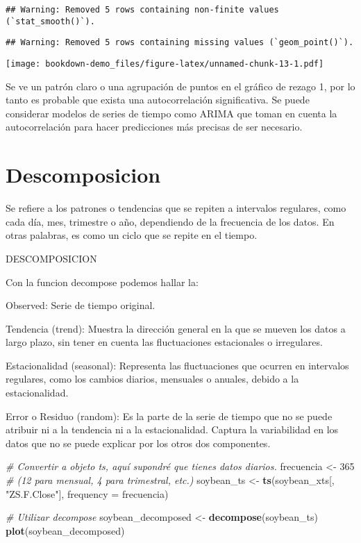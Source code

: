 \documentclass[
]{book}
\newenvironment{Shaded}{\begin{snugshade}}{\end{snugshade}}
\newcommand{\AttributeTok}[1]{\textcolor[rgb]{0.13,0.29,0.53}{#1}}
\newcommand{\CommentTok}[1]{\textcolor[rgb]{0.56,0.35,0.01}{\textit{#1}}}
\newcommand{\DecValTok}[1]{\textcolor[rgb]{0.00,0.00,0.81}{#1}}
\newcommand{\FunctionTok}[1]{\textcolor[rgb]{0.13,0.29,0.53}{\textbf{#1}}}
\newcommand{\NormalTok}[1]{#1}
\newcommand{\OtherTok}[1]{\textcolor[rgb]{0.56,0.35,0.01}{#1}}
\newcommand{\StringTok}[1]{\textcolor[rgb]{0.31,0.60,0.02}{#1}}
\begin{document}
\begin{verbatim}
## Warning: Removed 5 rows containing non-finite values (`stat_smooth()`).
\end{verbatim}

\begin{verbatim}
## Warning: Removed 5 rows containing missing values (`geom_point()`).
\end{verbatim}

\texttt{[image: bookdown-demo\_files/figure-latex/unnamed-chunk-13-1.pdf]}

Se ve un patrón claro o una agrupación de puntos en el gráfico de rezago 1, por lo tanto es probable que exista una autocorrelación significativa. Se puede considerar modelos de series de tiempo como ARIMA que toman en cuenta la autocorrelación para hacer predicciones más precisas de ser necesario.

\hypertarget{descomposicion}{%
\chapter{Descomposicion}\label{descomposicion}}

Se refiere a los patrones o tendencias que se repiten a intervalos regulares, como cada día, mes, trimestre o año, dependiendo de la frecuencia de los datos. En otras palabras, es como un ciclo que se repite en el tiempo.

DESCOMPOSICION

Con la funcion decompose podemos hallar la:

Observed: Serie de tiempo original.

Tendencia (trend): Muestra la dirección general en la que se mueven los datos a largo plazo, sin tener en cuenta las fluctuaciones estacionales o irregulares.

Estacionalidad (seasonal): Representa las fluctuaciones que ocurren en intervalos regulares, como los cambios diarios, mensuales o anuales, debido a la estacionalidad.

Error o Residuo (random): Es la parte de la serie de tiempo que no se puede atribuir ni a la tendencia ni a la estacionalidad. Captura la variabilidad en los datos que no se puede explicar por los otros dos componentes.

\begin{Shaded}
\begin{Highlighting}[]
\CommentTok{\# Convertir a objeto ts, aquí supondré que tienes datos diarios.}
\NormalTok{frecuencia }\OtherTok{\textless{}{-}} \DecValTok{365}  \CommentTok{\# (12 para mensual, 4 para trimestral, etc.)}
\NormalTok{soybean\_ts }\OtherTok{\textless{}{-}} \FunctionTok{ts}\NormalTok{(soybean\_xts[, }\StringTok{"ZS.F.Close"}\NormalTok{], }\AttributeTok{frequency =}\NormalTok{ frecuencia)}

\CommentTok{\# Utilizar decompose}
\NormalTok{soybean\_decomposed }\OtherTok{\textless{}{-}} \FunctionTok{decompose}\NormalTok{(soybean\_ts)}
\FunctionTok{plot}\NormalTok{(soybean\_decomposed)}
\end{Highlighting}
\end{Shaded}
\end{document}
